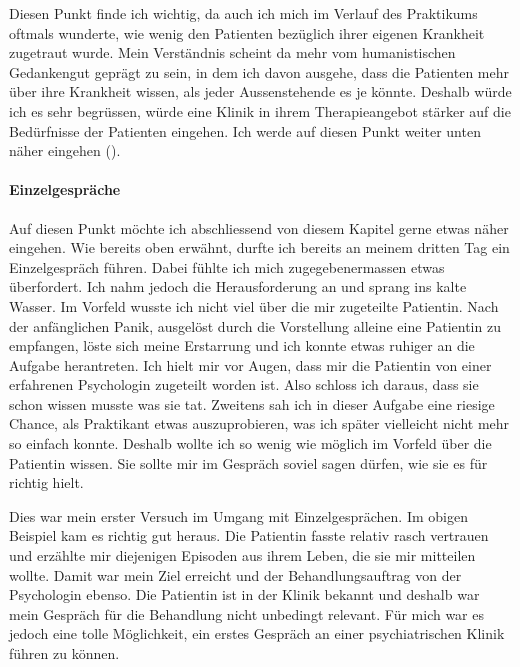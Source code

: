 Diesen Punkt finde ich wichtig, da auch ich mich im Verlauf des Praktikums oftmals wunderte, wie wenig den Patienten bezüglich ihrer eigenen Krankheit zugetraut wurde. Mein Verständnis scheint da mehr vom humanistischen Gedankengut geprägt zu sein, in dem ich davon ausgehe, dass die Patienten mehr über ihre Krankheit wissen, als jeder Aussenstehende es je könnte. Deshalb würde ich es sehr begrüssen, würde eine Klinik in ihrem Therapieangebot stärker auf die Bedürfnisse der Patienten eingehen. Ich werde auf diesen Punkt weiter unten näher eingehen ().

\paragraph{Einzelgespräche}
Auf diesen Punkt möchte ich abschliessend von diesem Kapitel gerne etwas näher eingehen. Wie bereits oben erwähnt, durfte ich bereits an meinem dritten Tag ein Einzelgespräch führen. Dabei fühlte ich mich zugegebenermassen etwas überfordert. Ich nahm jedoch die Herausforderung an und sprang ins kalte Wasser. Im Vorfeld wusste ich nicht viel über die mir zugeteilte Patientin. Nach der anfänglichen Panik, ausgelöst durch die Vorstellung alleine eine Patientin zu empfangen, löste sich meine Erstarrung und ich konnte etwas ruhiger an die Aufgabe herantreten. Ich hielt mir vor Augen, dass mir die Patientin von einer erfahrenen Psychologin zugeteilt worden ist. Also schloss ich daraus, dass sie schon wissen musste was sie tat. Zweitens sah ich in dieser Aufgabe eine riesige Chance, als Praktikant etwas auszuprobieren, was ich später vielleicht nicht mehr so einfach konnte. Deshalb wollte ich so wenig wie möglich im Vorfeld über die Patientin wissen. Sie sollte mir im Gespräch soviel sagen dürfen, wie sie es für richtig hielt. 

Dies war mein erster Versuch im Umgang mit Einzelgesprächen. Im obigen Beispiel kam es richtig gut heraus. Die Patientin fasste relativ rasch vertrauen und erzählte mir diejenigen Episoden aus ihrem Leben, die sie mir mitteilen wollte. Damit war mein Ziel erreicht und der Behandlungsauftrag von der Psychologin ebenso. Die Patientin ist in der Klinik bekannt und deshalb war mein Gespräch für die Behandlung nicht unbedingt relevant. Für mich war es jedoch eine tolle Möglichkeit, ein erstes Gespräch an einer psychiatrischen Klinik führen zu können.

